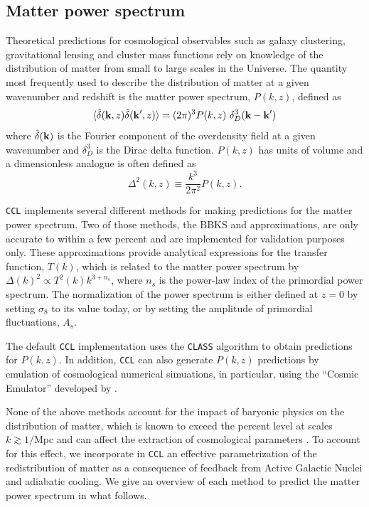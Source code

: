 \documentclass[\docopts]{\docclass}
\newcommand{\ccl}{{\tt CCL}\xspace}
\begin{document}
\subsection{Matter power spectrum}
\label{sec:matterps}

Theoretical predictions for cosmological observables such as galaxy clustering, gravitational lensing and cluster mass functions rely on knowledge of the distribution of matter from small to large scales in the Universe. The quantity most frequently used to describe the distribution of matter at a given wavenumber and redshift is the matter power spectrum, $P(k,z)$, defined as
\begin{equation}
  \langle \tilde\delta({\bf k},z)\tilde\delta({\bf k}^\prime,z)\rangle = (2\pi)^3P(k,z)\
\delta_D^3({\bf k}-{\bf k}')
\end{equation}
where $\tilde\delta({\bf k})$ is the Fourier component of the overdensity field at a given wavenumber and $\delta_D^3$ is the Dirac delta function. $P(k,z)$ has units of volume and a dimensionless analogue is often defined as
\begin{equation}
  \Delta^2(k,z) \equiv \frac{k^3}{2\pi^2}P(k,z).
\end{equation}

\ccl implements several different methods for making predictions for the matter power spectrum. Two of those methods, the BBKS \citep{BBKS} and \citet{1998ApJ...496..605E} approximations, are only accurate to within a few percent and are implemented for validation purposes only. These approximations provide analytical expressions for the transfer function, $T(k)$, which is related to the matter power spectrum by $\Delta(k)^2 \propto T^2(k) k^{3+n_s}$, where $n_s$ is the power-law index of the primordial power spectrum. The normalization of the power spectrum is either defined at $z=0$ by setting $\sigma_8$ to its value today, or by setting the amplitude of primordial fluctuations, $A_s$.

The default \ccl implementation uses the {\tt CLASS} algorithm \citet{class} to obtain predictions for $P(k,z)$. In addition, \ccl can also generate $P(k,z)$ predictions by emulation of cosmological numerical simuations, in particular, using the ``Cosmic Emulator'' developed by \citet{Lawrence17}. 

None of the above methods account for the impact of baryonic physics on the distribution of matter, which is known to exceed the percent level at scales $k \gtrsim 1/$Mpc \citep{vanDaalen11,Illustris,Hellwing16,Springel17} and can affect the extraction of cosmological parameters \citep{Semboloni11,Semboloni13,Mohammed14,Eifler15,Mohammed17}. To account for this effect, we incorporate in \ccl an effective parametrization \citep{Schneider15} of the redistribution of matter as a consequence of feedback from Active Galactic Nuclei and adiabatic cooling. We give an overview of each method to predict the matter power spectrum in what follows.
\end{document}
